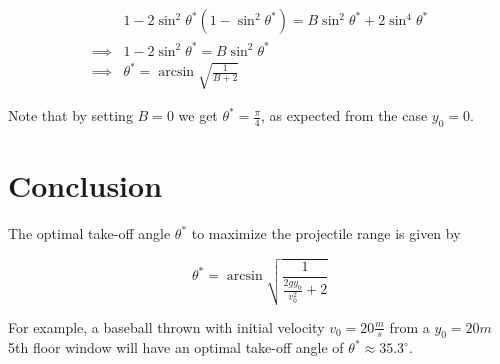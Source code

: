 \documentclass[a4paper,10pt]{article}
\begin{document}
\begin{equation}
    \begin{aligned}
        & 1
        - 2\sin^2\theta^*\left(
            1-\sin^2\theta^*
        \right)
        = B\sin^2\theta^*
        + 2\sin^4\theta^*\\
        \implies & 1
        - 2\sin^2\theta^*
        = B\sin^2\theta^*\\
        \implies & \theta^*
        = \arcsin\sqrt{
            \frac{
                1
            }{
                B
                + 2
            }
        }
    \end{aligned}
\end{equation}

Note that by setting $B=0$
we get $\theta^*=\frac{\pi}{4}$,
as expected from the case $y_0=0$.

\section{Conclusion}

The optimal take-off angle $\theta^*$
to maximize the projectile range
is given by

\begin{equation}
    \theta^* = \arcsin\sqrt{
        \frac{
            1
        }{
            \frac{
                2gy_0
            }{
                v_0^2
            }
            + 2
        }
    }
\end{equation}

For example, a baseball thrown with
initial velocity $v_0=20\frac{m}{s}$
from a $y_0=20m$ 5th floor window
will have an optimal take-off angle of
$\theta^* \approx 35.3^\circ$.
\end{document}
